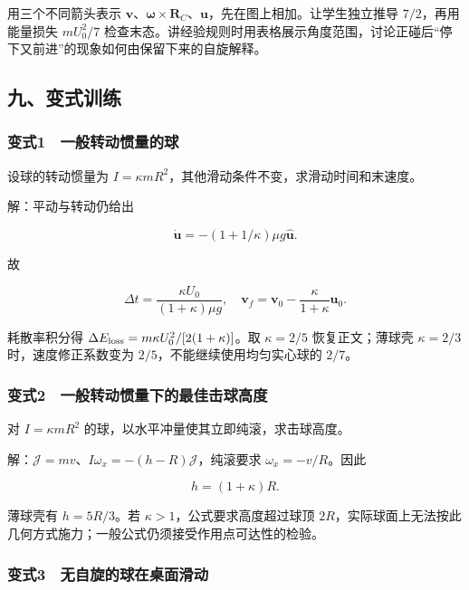 \documentclass[12pt,a4paper,fontset=fandol]{ctexart}
\begin{document}
用三个不同箭头表示
\(\boldsymbol v\)、\(\boldsymbol\omega\times\boldsymbol R_C\)、\(\boldsymbol u\)，先在图上相加。让学生独立推导
\(7/2\)，再用能量损失 \(mU_0^2/7\)
检查末态。讲经验规则时用表格展示角度范围，讨论正碰后``停下又前进''的现象如何由保留下来的自旋解释。

\subsection{九、变式训练}\label{ux4e5dux53d8ux5f0fux8badux7ec3-1}

\subsubsection{变式1　一般转动惯量的球}\label{ux53d8ux5f0f1-ux4e00ux822cux8f6cux52a8ux60efux91cfux7684ux7403}

设球的转动惯量为
\(I=\kappa mR^2\)，其他滑动条件不变，求滑动时间和末速度。

解：平动与转动仍给出

\[\dot{\boldsymbol u}=-(1+1/\kappa)\mu g\widehat{\boldsymbol u}.\]

故

\[\boxed{\Delta t=\frac{\kappa U_0}{(1+\kappa)\mu g},
\quad\boldsymbol v_f=\boldsymbol v_0-
\frac\kappa{1+\kappa}\boldsymbol u_0.}\]

耗散率积分得 \(\Delta E_{\rm loss}=m\kappa U_0^2/[2(1+\kappa)]\)。取
\(\kappa=2/5\) 恢复正文；薄球壳 \(\kappa=2/3\) 时，速度修正系数变为
\(2/5\)，不能继续使用均匀实心球的 \(2/7\)。

\subsubsection{变式2　一般转动惯量下的最佳击球高度}\label{ux53d8ux5f0f2-ux4e00ux822cux8f6cux52a8ux60efux91cfux4e0bux7684ux6700ux4f73ux51fbux7403ux9ad8ux5ea6}

对 \(I=\kappa mR^2\) 的球，以水平冲量使其立即纯滚，求击球高度。

解：\(\mathcal J=mv\)、\(I\omega_x=-(h-R)\mathcal J\)，纯滚要求
\(\omega_x=-v/R\)。因此

\[\boxed{h=(1+\kappa)R.}\]

薄球壳有 \(h=5R/3\)。若 \(\kappa>1\)，公式要求高度超过球顶
\(2R\)，实际球面上无法按此几何方式施力；一般公式仍须接受作用点可达性的检验。

\subsubsection{变式3　无自旋的球在桌面滑动}\label{ux53d8ux5f0f3-ux65e0ux81eaux65cbux7684ux7403ux5728ux684cux9762ux6ed1ux52a8}
\end{document}
